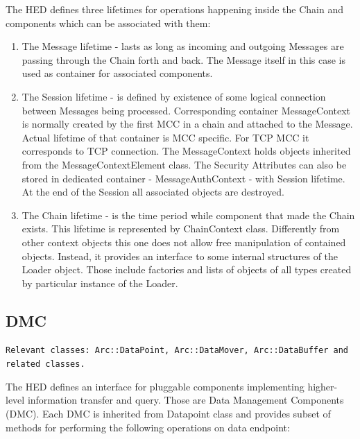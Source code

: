 \documentclass{book}
\begin{document}
The HED defines three lifetimes for operations happening inside the Chain and components which can be associated with them:


\begin{enumerate}

\item The Message lifetime - lasts as long as incoming and outgoing Messages are passing through the Chain forth and back. The Message itself in this case is used as container for associated components.

\item The Session lifetime - is defined by existence of some logical connection between Messages being processed. Corresponding container MessageContext is normally created by the first MCC in a chain and attached to the Message. Actual lifetime of that container is MCC specific. For TCP MCC it corresponds to TCP connection. The MessageContext holds objects inherited from the MessageContextElement class. The Security Attributes can also be stored in dedicated container - MessageAuthContext - with Session lifetime. At the end of  the Session all associated objects are destroyed.

\item The Chain lifetime - is the time period while component that made the Chain exists. This lifetime is represented by ChainContext class. Differently from other context objects this one does not allow free manipulation of contained objects. Instead, it provides an interface to some internal structures of the Loader object. Those include factories and lists of objects of all types created by particular instance of the Loader.

\end{enumerate}


\subsection{DMC}

\texttt{Relevant classes: Arc::DataPoint, Arc::DataMover, Arc::DataBuffer and related classes.}

The HED defines an interface for pluggable components implementing higher-level information transfer and query. Those are Data Management Components (DMC). Each DMC is inherited from Datapoint class and provides subset of methods for performing the following operations on data endpoint:
\end{document}

